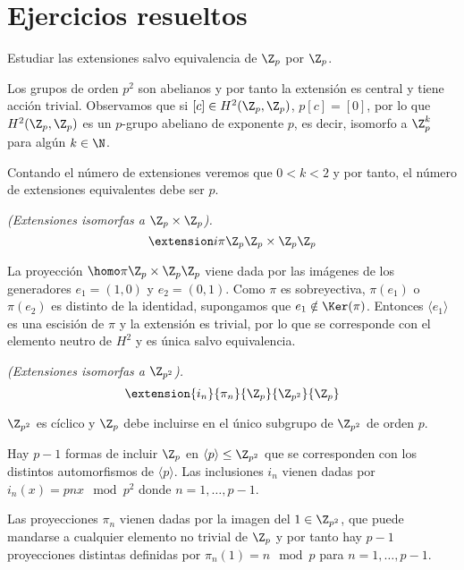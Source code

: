 \chapter{Ejercicios resueltos}

\begin{ejercicio}
	Estudiar las extensiones salvo equivalencia de $\Z_p$ por $\Z_p$. %
	\begin{solucion}
		Los grupos de orden $p^2$ son abelianos y por tanto la extensión es central y tiene acción trivial.
		Observamos que si $[c]\in H^2(\Z_p,\Z_p)$, $p[c] = [0]$, por lo que $H^2(\Z_p,\Z_p)$ es un $p$-grupo abeliano de exponente $p$, es decir, isomorfo a $\Z_p^k$ para algún $k\in \N$.
		
		Contando el número de extensiones veremos que $0<k<2$ y por tanto, el número de extensiones equivalentes debe ser $p$.
		
		\textit{(Extensiones isomorfas a $\Z_p\times \Z_p$).}
		\begin{equation*}
			\extension i \pi {\Z_p} {\Z_p\times \Z_p} {\Z_p}
		\end{equation*}
		
		La proyección $\homo \pi {\Z_p\times \Z_p} {\Z_p}$ viene dada por las imágenes de los generadores $e_1=(1,0)$ y $e_2=(0,1)$. Como $\pi$ es sobreyectiva, $\pi(e_1)$ o $\pi(e_2)$ es distinto de la identidad, supongamos que $e_1\notin \Ker(\pi)$. Entonces $\langle e_1 \rangle$ es una escisión de $\pi$ y la extensión es trivial, por lo que se corresponde con el elemento neutro de $H^2$ y es única salvo equivalencia.
		
		\textit{(Extensiones isomorfas a $\Z_{p^2}$).}
		\begin{equation*}
			\extension {i_n} {\pi_n} {\Z_p} {\Z_{p^2}} {\Z_p}
		\end{equation*}
		
		$\Z_{p^2}$ es cíclico y $\Z_p$ debe incluirse en el único subgrupo de $\Z_{p^2}$ de orden $p$. 
		
		Hay $p-1$ formas de incluir $\Z_p$ en $\langle p \rangle \leq \Z_{p^2}$ que se corresponden con los distintos automorfismos de $\langle p \rangle$. Las inclusiones $i_n$ vienen dadas por $i_n(x) = pnx \mod p^2$ donde $n=1,\ldots,p-1$.
		
		Las proyecciones $\pi_n$ vienen dadas por la imagen del $1\in \Z_{p^2}$, que puede mandarse a cualquier elemento no trivial de $\Z_p$ y por tanto hay $p-1$ proyecciones distintas definidas por $\pi_n(1) = n \mod p$ para $n=1,\ldots, p-1$.
		

\end{solucion}
\end{ejercicio}
